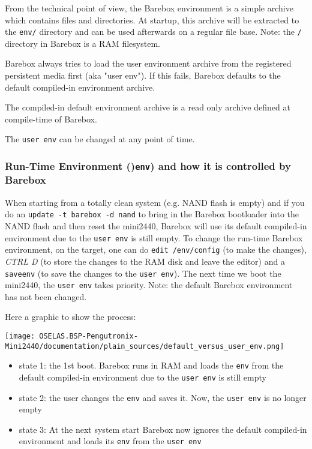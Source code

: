 From the technical point of view, the Barebox environment is a simple
archive which contains files and directories. At startup, this archive will
be extracted to the \texttt{env/} directory and can be used afterwards
on a regular file base. Note: the \texttt{/} directory in Barebox is a RAM
filesystem.

Barebox always tries to load the user environment archive from the registered
persistent media first (aka "user env"). If this fails, Barebox defaults to the
default compiled-in environment archive.

The compiled-in default environment archive is a read only archive defined at
compile-time of Barebox.

The \texttt{user env} can be changed at any point of time.

\subsubsection{Run-Time Environment ()\texttt{env}) and how it is controlled by Barebox}

When starting from a totally clean system (e.g. NAND flash is empty) and if
you do an \texttt{update -t barebox -d nand} to bring in the Barebox bootloader
into the NAND flash and then reset the mini2440, Barebox will use its default
compiled-in environment due to the \texttt{user env} is still empty. To change
the run-time Barebox environment, on the target, one can do \texttt{edit /env/config}
(to make the changes), \textit{CTRL D} (to store the changes to the RAM disk and
leave the editor) and a \texttt{saveenv} (to save the changes to the
\texttt{user env}). The next time we boot the mini2440, the \texttt{user env}
takes priority. Note: the default Barebox environment has not been changed.

Here a graphic to show the process:

\centerline{\texttt{[image: OSELAS.BSP-Pengutronix-Mini2440/documentation/plain\_sources/default\_versus\_user\_env.png]}}

\begin{itemize}
	\item state 1: the 1st boot. Barebox runs in RAM and loads the
	      \texttt{env} from the default compiled-in environment due to the
	      \texttt{user env} is still empty
	\item state 2: the user changes the \texttt{env} and saves it. Now, the
	      \texttt{user env} is no longer empty
	\item state 3: At the next system start Barebox now ignores the default
	      compiled-in environment and loads its \texttt{env} from the
	      \texttt{user env}
\end{itemize}

